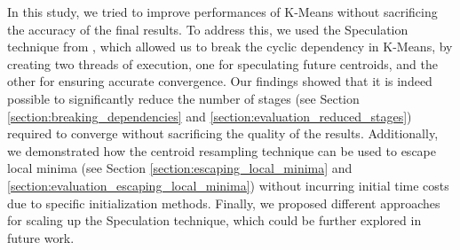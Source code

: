 In this study, we tried to improve performances of K-Means without sacrificing the accuracy of the final results. To address this, we used the Speculation technique from \cite{Sioulas:282304}, which allowed us to break the cyclic dependency in K-Means, by creating two threads of execution, one for speculating future centroids, and the other for ensuring accurate convergence. Our findings showed that it is indeed possible to significantly reduce the number of stages (see Section \ref{section:breaking_dependencies} 
 and \ref{section:evaluation_reduced_stages})  required to converge without sacrificing the quality of the results. Additionally, we demonstrated how the centroid resampling technique can be used to escape local minima (see Section \ref{section:escaping_local_minima} and \ref{section:evaluation_escaping_local_minima}) without incurring initial time costs due to specific initialization methods. Finally, we proposed different approaches for scaling up the Speculation technique, which could be further explored in future work.